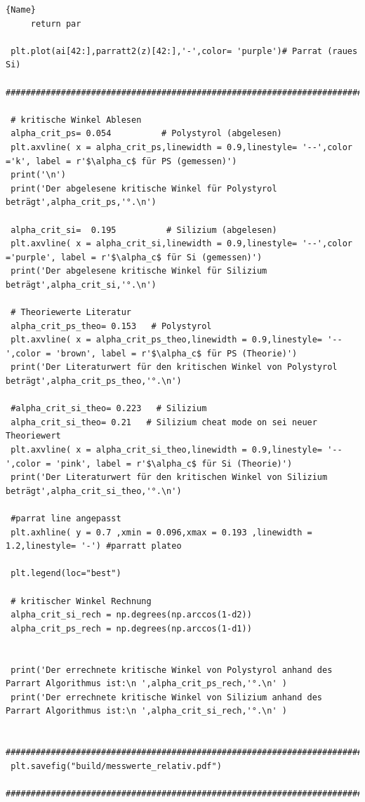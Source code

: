 \begin{lstlisting}{Name}
     return par
 
 plt.plot(ai[42:],parratt2(z)[42:],'-',color= 'purple')# Parrat (raues Si) 
 ########################################################################################################
 
 # kritische Winkel Ablesen
 alpha_crit_ps= 0.054          # Polystyrol (abgelesen)
 plt.axvline( x = alpha_crit_ps,linewidth = 0.9,linestyle= '--',color ='k', label = r'$\alpha_c$ für PS (gemessen)')
 print('\n')
 print('Der abgelesene kritische Winkel für Polystyrol beträgt',alpha_crit_ps,'°.\n')
 
 alpha_crit_si=  0.195          # Silizium (abgelesen)
 plt.axvline( x = alpha_crit_si,linewidth = 0.9,linestyle= '--',color ='purple', label = r'$\alpha_c$ für Si (gemessen)')
 print('Der abgelesene kritische Winkel für Silizium  beträgt',alpha_crit_si,'°.\n')
 
 # Theoriewerte Literatur
 alpha_crit_ps_theo= 0.153   # Polystyrol
 plt.axvline( x = alpha_crit_ps_theo,linewidth = 0.9,linestyle= '--',color = 'brown', label = r'$\alpha_c$ für PS (Theorie)')
 print('Der Literaturwert für den kritischen Winkel von Polystyrol beträgt',alpha_crit_ps_theo,'°.\n')
 
 #alpha_crit_si_theo= 0.223   # Silizium
 alpha_crit_si_theo= 0.21   # Silizium cheat mode on sei neuer Theoriewert 
 plt.axvline( x = alpha_crit_si_theo,linewidth = 0.9,linestyle= '--',color = 'pink', label = r'$\alpha_c$ für Si (Theorie)')
 print('Der Literaturwert für den kritischen Winkel von Silizium beträgt',alpha_crit_si_theo,'°.\n')
 
 #parrat line angepasst
 plt.axhline( y = 0.7 ,xmin = 0.096,xmax = 0.193 ,linewidth = 1.2,linestyle= '-') #parratt plateo
 
 plt.legend(loc="best")
 
 # kritischer Winkel Rechnung
 alpha_crit_si_rech = np.degrees(np.arccos(1-d2))
 alpha_crit_ps_rech = np.degrees(np.arccos(1-d1))
 
 
 print('Der errechnete kritische Winkel von Polystyrol anhand des Parrart Algorithmus ist:\n ',alpha_crit_ps_rech,'°.\n' )
 print('Der errechnete kritische Winkel von Silizium anhand des Parrart Algorithmus ist:\n ',alpha_crit_si_rech,'°.\n' )
 
 ########################################################################################################
 plt.savefig("build/messwerte_relativ.pdf")
 ########################################################################################################
 
\end{lstlisting}
 
\nocite{*}
\printbibliography{}
